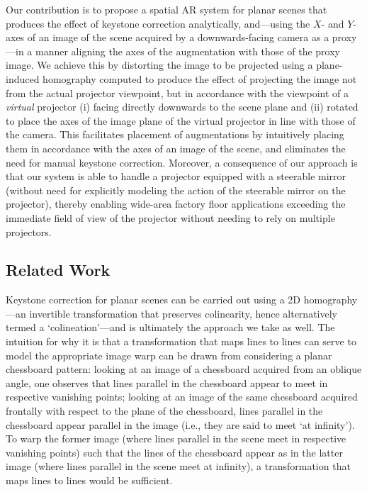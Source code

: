 \documentclass[review]{elsarticle}
\begin{document}
Our contribution is to propose a spatial AR system for planar scenes that produces the effect of keystone correction analytically, and---using the $X$- and $Y$-axes of an image of the scene acquired by a downwards-facing camera as a proxy---in a manner aligning the axes of the augmentation with those of the proxy image. We achieve this by distorting the image to be projected using a plane-induced homography computed to produce the effect of projecting the image not from the actual projector viewpoint, but in accordance with the viewpoint of a \textit{virtual} projector (i) facing directly downwards to the scene plane and (ii) rotated to place the axes of the image plane of the virtual projector in line with those of the camera. This facilitates placement of augmentations by intuitively placing them in accordance with the axes of an image of the scene, and eliminates the need for manual keystone correction. Moreover, a consequence of our approach is that our system is able to handle a projector equipped with a steerable mirror (without need for explicitly modeling the action of the steerable mirror on the projector), thereby enabling wide-area factory floor applications exceeding the immediate field of view of the projector without needing to rely on multiple projectors.

\subsection{Related Work}

Keystone correction for planar scenes can be carried out using a 2D homography \cite{Hartley2004}---an invertible transformation that preserves colinearity, hence alternatively termed a `colineation'---and is ultimately the approach we take as well. The intuition for why it is that a transformation that maps lines to lines can serve to model the appropriate image warp can be drawn from considering a planar chessboard pattern: looking at an image of a chessboard acquired from an oblique angle, one observes that lines parallel in the chessboard appear to meet in respective vanishing points; looking at an image of the same chessboard acquired frontally with respect to the plane of the chessboard, lines parallel in the chessboard appear parallel in the image (i.e., they are said to meet `at infinity'). To warp the former image (where lines parallel in the scene meet in respective vanishing points) such that the lines of the chessboard appear as in the latter image (where lines parallel in the scene meet at infinity), a transformation that maps lines to lines would be sufficient.
\end{document}
